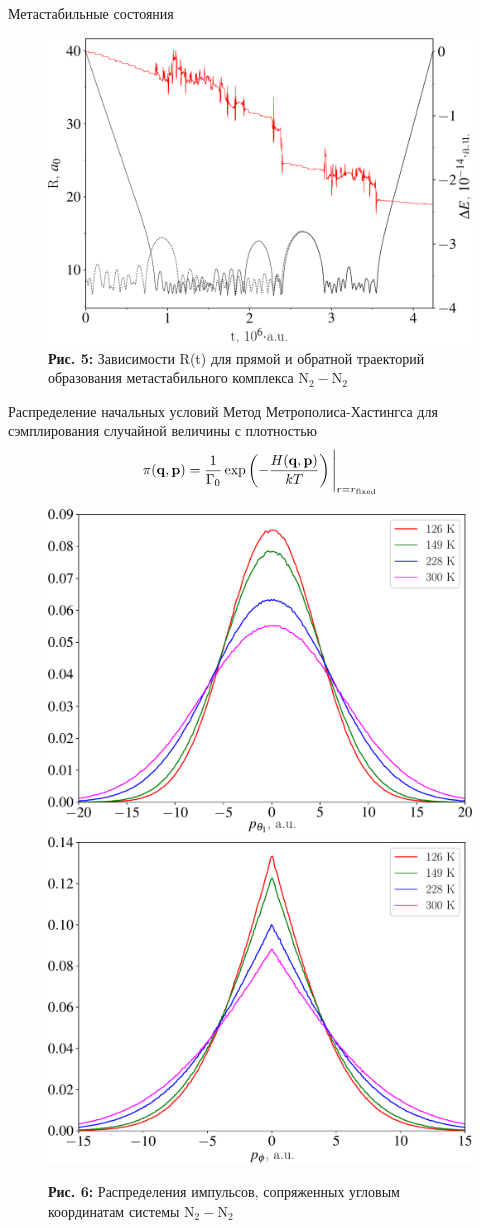 \documentclass[10pt,usenames,pdf,hyperref={unicode},dvipsnames]{beamer}
\newcommand{\lb}{\left(}
\newcommand{\rb}{\right)}
\newcommand{\mf}{\mathbf}
\newcommand{\mycaption}[2]{
    \textbf{#1:} #2
}
\begin{document}
\begin{frame}{Метастабильные состояния}
    \vspace*{-0.5cm}
    \begin{figure}[H]
        \includegraphics[width=0.8\linewidth]{./pictures/euler_trajectory-crop.pdf} \\
        \mycaption{Рис. 5}{Зависимости R(t) для прямой и обратной траекторий образования метастабильного комплекса N$_2-$N$_2$}
    \end{figure}
\end{frame}

\begin{frame}{Распределение начальных условий}
    \vspace*{-0.1cm}
	Метод Метрополиса-Хастингса для сэмплирования случайной величины с плотностью  
    \vspace*{-0.1cm}
    \begin{gather}
        \pi(\mf{q}, \mf{p}) = \frac{1}{\Gamma_0} \exp \lb -\frac{H(\mf{q}, \mf{p})}{kT} \rb \Bigg{|}_{r = r_\text{fixed}} \notag
    \end{gather}

    \begin{figure}[H]
        \includegraphics[width=0.49\linewidth]{./pictures/pTheta1-crop.pdf}
        \includegraphics[width=0.49\linewidth]{./pictures/pPhi-crop.pdf}
        \mycaption{Рис. 6}{Распределения импульсов, сопряженных угловым координатам системы N$_2-$N$_2$}
    \end{figure}
\end{frame}
\end{document}
